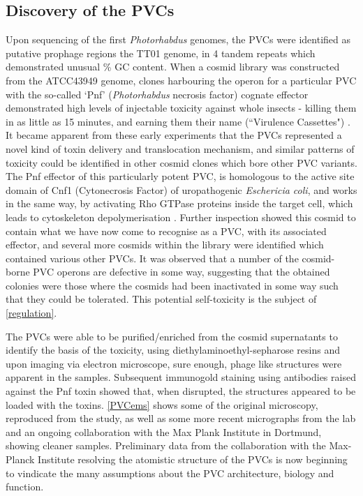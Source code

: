 \subsection{Discovery of the PVCs}
Upon sequencing of the first \emph{Photorhabdus} genomes, the PVCs were identified as putative prophage regions the \Plum{} TT01 genome, in 4 tandem repeats which demonstrated unusual \% GC content. When a cosmid library was constructed from the \Pasy{} ATCC43949 genome, clones harbouring the operon for a particular PVC with the so-called `Pnf' (\emph{Photorhabdus} necrosis factor) cognate effector demonstrated high levels of injectable toxicity against whole insects - killing them in as little as 15 minutes, and earning them their name (``Virulence Cassettes") \citep{Yang2006, Waterfield2008}. It became apparent from these early experiments that the PVCs represented a novel kind of toxin delivery and translocation mechanism, and similar patterns of toxicity could be identified in other cosmid clones which bore other PVC variants. The Pnf effector of this particularly potent PVC, is homologous to the active site domain of Cnf1 (Cytonecrosis Factor) of uropathogenic \emph{Eschericia coli}, and works in the same way, by activating Rho GTPase proteins inside the target cell, which leads to cytoskeleton depolymerisation \citep{Landraud2004, Buetow2001}. Further inspection showed this cosmid to contain what we have now come to recognise as a PVC, with its associated effector, and several more cosmids within the library were identified which contained various other PVCs. It was observed that a number of the cosmid-borne PVC operons are defective in some way, suggesting that the obtained colonies were those where the cosmids had been inactivated in some way such that they could be tolerated. This potential self-toxicity is the subject of \vref{regulation}.

The PVCs were able to be purified/enriched from the cosmid supernatants to identify the basis of the toxicity, using diethylaminoethyl-sepharose resins and upon imaging via electron microscope, sure enough, phage like structures were apparent in the samples. Subsequent immunogold staining using antibodies raised against the Pnf toxin showed that, when disrupted, the structures appeared to be loaded with the toxins. \vref{PVCems} shows some of the original microscopy, reproduced from the \cite{Yang2006} study, as well as some more recent micrographs from the lab and an ongoing collaboration with the Max Plank Institute in Dortmund, showing cleaner samples. Preliminary data from the collaboration with the Max-Planck Institute resolving the atomistic structure of the PVCs is now beginning to vindicate the many assumptions about the PVC architecture, biology and function.

